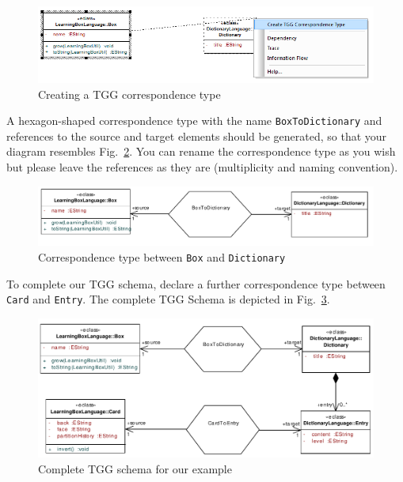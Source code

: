 \begin{figure}[htbp]
\begin{center}
  \includegraphics[width=\textwidth]{pics/tggBilder/tggSchema/tgg5}
  \caption{Creating a TGG correspondence type} 
  \label{fig:create_correspondence}
\end{center}
\end{figure}

A hexagon-shaped correspondence type with the name \texttt{BoxToDiction\-ary} and references to the source and target elements should be generated, so that your diagram resembles Fig.~\ref{fig:first_correspondence}.
You can rename the correspondence type as you wish but please leave the references as they are (multiplicity and naming convention).

\begin{figure}[htbp]
\begin{center}
  \includegraphics[width=\textwidth]{pics/tggBilder/tggSchema/tgg6}
  \caption{Correspondence type between \texttt{Box} and \texttt{Dictionary}}
  \label{fig:first_correspondence}
\end{center}
\end{figure}

To complete our TGG schema, declare a further correspondence type between \texttt{Card} and \texttt{Entry}.
The complete TGG Schema is depicted in Fig.~\ref{fig:complete_tgg_schema}.

\begin{figure}[htbp]
\begin{center}
  \includegraphics[width=\textwidth]{pics/tggBilder/tggSchema/tgg7}
  \caption{Complete TGG schema for our example}
  \label{fig:complete_tgg_schema}
\end{center}
\end{figure}

